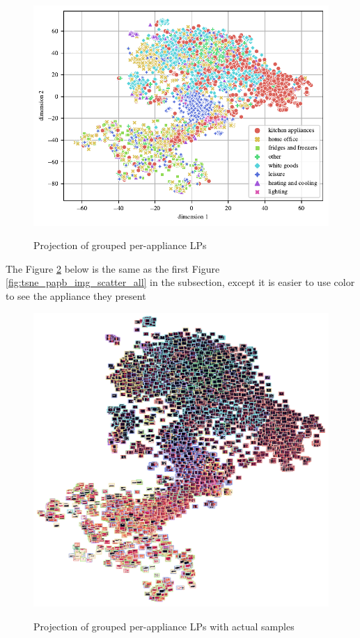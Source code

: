\begin{figure}[H]
	\centering
	\caption{Projection of grouped per-appliance LPs}
	\includegraphics[]{Figures/TSNE/TSNE_PHPA/phpa_grouped_15.pdf}
	\label{fig:tsne_papb_scatter_all_groups}
\end{figure} 

The Figure \ref{fig:tsne_papb_img_scatter_all_groups} below is the same as the first Figure \ref{fig:tsne_papb_img_scatter_all} in the subsection,
except it is easier to use color to see the appliance they present

\begin{figure}[H]  
	\centering
	\caption{Projection of grouped per-appliance LPs with actual samples}
	\includegraphics[width=.9\textwidth]{Figures/TSNE/TSNE_PHPA/img_scatter_all_all_groups.png}
	\label{fig:tsne_papb_img_scatter_all_groups}
\end{figure}


